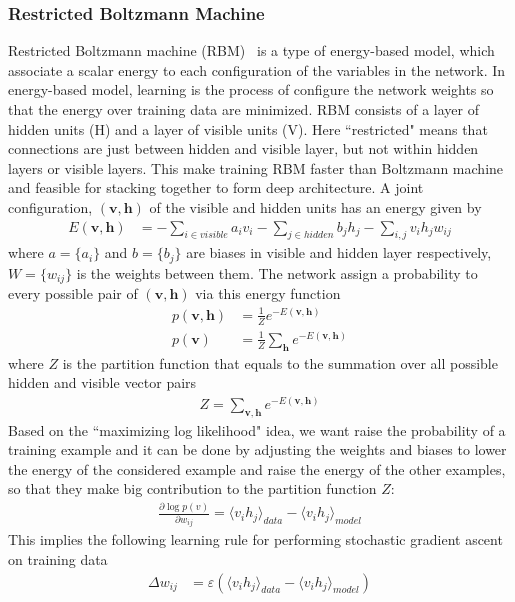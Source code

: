 \subsubsection{Restricted Boltzmann Machine}
Restricted Boltzmann machine (RBM)~\cite{RBMTechReport} is a type of energy-based model,
which associate a scalar energy to each configuration of the variables in the network.
In energy-based model, learning is the process of configure the network weights so that
the energy over training data are minimized.
RBM consists of a layer of hidden units (H) and a layer of visible units (V).
Here ``restricted" means that connections are just between hidden and visible layer,
but not within hidden layers or visible layers.
This make training RBM faster than Boltzmann machine and feasible for stacking together
to form deep architecture.
A joint configuration, $(\mathbf{v, h})$ of the visible and hidden units has an energy given by
\begin{align}
        E(\mathbf{v, h}) &= -\sum_{i\in visible}a_i v_i - \sum_{j\in hidden}b_j h_j - \sum_{i, j}v_i h_j w_{ij}
\end{align}
where $a=\{a_i\}$ and $b=\{b_j\}$ are biases in visible and hidden layer respectively,
$W=\{w_{ij}\}$ is the weights between them.
The network assign a probability to every possible pair of $(\mathbf{v, h})$ via this energy
function
\begin{align}
        p(\mathbf{v, h}) &= \frac{1}{Z} e^{-E(\mathbf{v, h})} \\
        p(\mathbf{v}) &= \frac{1}{Z} \sum_{\mathbf{h}} e^{-E(\mathbf{v, h})}
\end{align}
where $Z$ is the partition function that equals to the summation over all possible hidden
and visible vector pairs
\begin{align}
        Z = \sum_{\mathbf{v,h}} e^{-E(\mathbf{v, h})}
\end{align}
Based on the ``maximizing log likelihood" idea,
we want raise the probability of a training example and it can be done by
adjusting the weights and biases to lower the energy of the considered
example and raise the energy of the other examples, so that they make big contribution to
the partition function $Z$:
\begin{align}
        \frac{\partial \log p(v)}{\partial w_{ij}} = \langle v_i h_j \rangle_{data} - \langle v_i h_j \rangle_{model} 
\end{align}
This implies the following learning rule for performing stochastic gradient ascent on training
data
\begin{align}
        \Delta w_{ij} &= \varepsilon (\langle v_i h_j \rangle_{data} - \langle v_i h_j \rangle_{model})
\end{align}
